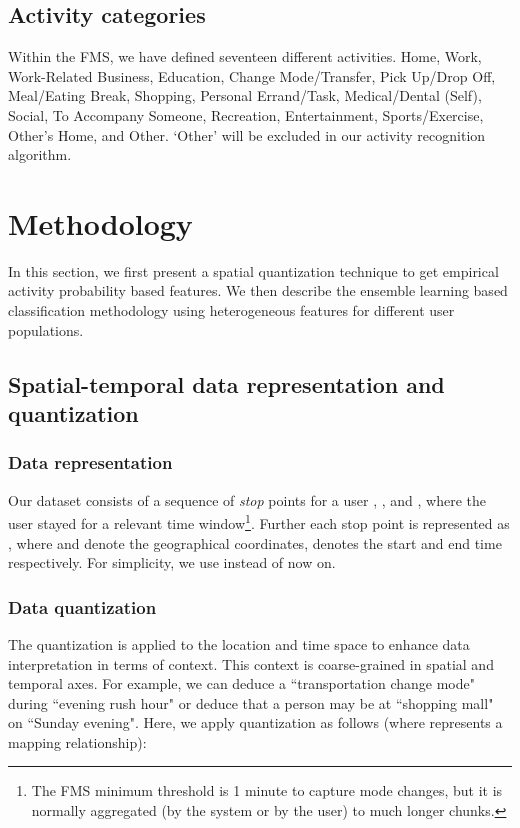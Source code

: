 \documentclass{sig-alternate}
\begin{document}
\subsection{Activity categories}
Within the FMS, we have defined seventeen different activities. Home, Work, Work-Related Business, Education, Change Mode/Transfer, Pick Up/Drop Off, Meal/Eating Break, Shopping, Personal Errand/Task, Medical/Dental (Self), Social, To Accompany Someone, Recreation, Entertainment,  Sports/Exercise, Other's Home, and Other. `Other' will be excluded in our activity recognition algorithm.



\section{Methodology}
 In this section, we first present a spatial quantization technique to get empirical activity probability based features. We then describe the ensemble learning based classification methodology using heterogeneous features for different user populations.


\subsection{Spatial-temporal data representation and quantization}


\subsubsection{Data representation}


Our dataset consists of a sequence of  \emph{stop} points for a user , , and , where the user  stayed for a relevant time window\footnote{The FMS minimum threshold is 1 minute to capture mode changes, but it is normally aggregated (by the system or by the user) to much longer chunks.}. Further each stop point is represented as , where  and  denote the geographical coordinates,  denotes the start and end time respectively. For simplicity, we use  instead of  now on.


\subsubsection{Data quantization}
 The quantization is applied to the location and time space to enhance data interpretation in terms of context. This context is coarse-grained in spatial and temporal axes. For example, we can deduce a ``transportation change mode" during ``evening rush hour" or deduce that a person may be at ``shopping mall" on ``Sunday evening".  Here, we apply quantization as follows (where  represents a mapping relationship):
\end{document}
